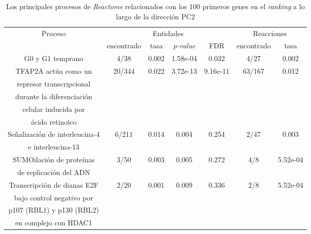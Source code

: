 
\chapter{}\label{apx:apx6}

\begin{table}[!htb]
	\centering
	\caption{Los principales procesos de \textit{Reactome} relacionados con los 100 primeros genes en el \textit{ranking} a lo largo de la dirección PC2}
	\label{tab:apx6}
	\begin{tabular}{|c|c|c|c|c|c|c|}
		\hline
		\multirow{2}{*}{Proceso} & \multicolumn{4}{c|}{Entidades} & \multicolumn{2}{c|}{Reacciones} \\ \cline{2-7}
		& encontrado & tasa & \textit{p-value} & FDR & encontrado & tasa \\ \hline
		
		G0 y G1 temprano & 4/38 & 0.002 & 1.58e-04 & 0.032 & 4/27 & 0.002 \\ \hline
		
		TFAP2A actúa como un & \multirow{5}{*}{20/344} & \multirow{5}{*}{0.022} & \multirow{5}{*}{3.72e-13} & \multirow{5}{*}{9.16e-11} & \multirow{5}{*}{63/167} & \multirow{5}{*}{0.012} \\
		represor transcripcional & & & & & & \\
		durante la diferenciación & & & & & & \\
		celular inducida por & & & & & & \\
		ácido retinoico & & & & & & \\\hline
		
		Señalización de interleucina-4 & \multirow{2}{*}{6/211} & \multirow{2}{*}{0.014} & \multirow{2}{*}{0.004} & \multirow{2}{*}{0.254} & \multirow{2}{*}{2/47} & \multirow{2}{*}{0.003} \\
		e interleucina-13 & & & & & & \\\hline
		
		SUMOilación de proteínas & \multirow{2}{*}{3/50} & \multirow{2}{*}{0.003} & \multirow{2}{*}{0.005} & \multirow{2}{*}{0.272} & \multirow{2}{*}{4/8} & \multirow{2}{*}{5.52e-04} \\
		de replicación del ADN & & & & & & \\\hline
		
		Transcripción de dianas E2F & \multirow{4}{*}{2/20} & \multirow{4}{*}{0.001} & \multirow{4}{*}{0.009} & \multirow{4}{*}{0.336} & \multirow{4}{*}{2/8} & \multirow{4}{*}{5.52e-04} \\
		bajo control negativo por & & & & & & \\
		p107 (RBL1) y p130 (RBL2) & & & & & & \\
		en complejo con HDAC1 & & & & & & \\\hline
		

\end{tabular}
\end{table}
